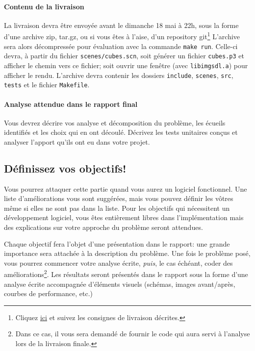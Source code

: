 \documentclass[10pt, a4paper ]{article}
\begin{document}
\paragraph{Contenu de la livraison} La livraison devra être envoyée avant le
dimanche 18 mai à 22h, sous la forme d'une archive zip, tar.gz, ou si vous êtes à
l'aise, d'un repository git\footnote{Cliquez
    \href{https://github.com/xoolive/raytracer/blob/master/github.md}{ici} et
suivez les consignes de livraison décrites.}  L'archive sera alors décompressée
pour évaluation avec la commande \texttt{make run}. Celle-ci devra, à partir du
fichier \texttt{scenes/cubes.scn},  soit générer un fichier \texttt{cubes.p3} et
afficher le chemin vers ce fichier; soit ouvrir une fenêtre (avec
\texttt{libimgsdl.a}) pour afficher le rendu.  L'archive devra contenir les
dossiers \texttt{include}, \texttt{scenes}, \texttt{src}, \texttt{tests} et le
fichier \texttt{Makefile}.


\paragraph{Analyse attendue dans le rapport final} Vous devrez décrire vos
analyse et décomposition du problème, les écueils identifiés et les choix qui en
ont découlé. Décrivez les tests unitaires conçus et analyser l'apport qu'ils ont
eu dans votre projet.


\subsection{Définissez vos objectifs! }
\label{sec:obj}

Vous pourrez attaquer cette partie quand vous aurez un logiciel fonctionnel. Une
liste d'améliorations vous sont suggérées, mais vous pouvez définir les vôtres
même si elles ne sont pas dans la liste. Pour les objectifs qui nécessitent un
développement logiciel, vous êtes entièrement libres dans l'implémentation mais
des explications sur votre approche du problème seront attendues.

Chaque objectif fera l'objet d'une présentation dans le rapport: une grande
importance sera attachée à la description du problème. Une fois le problème
posé, vous pourrez commencer votre analyse écrite, \emph{puis}, le cas échéant,
coder des améliorations\footnote{Dans ce cas, il vous sera demandé de fournir le
code qui aura servi à l'analyse lors de la livraison finale.}. Les résultats
seront présentés dans le rapport sous la forme d'une analyse écrite accompagnée
d'éléments visuels (schémas, images avant/après, courbes de performance, etc.)
\end{document}
